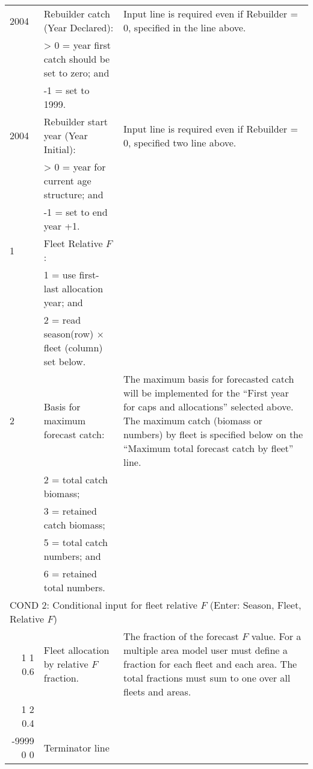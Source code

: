 \begin{landscape}
{\begin{longtable}{p{2cm} p{7cm} p{12cm}}
  \hline
  2004 & Rebuilder catch (Year Declared): & \multirow{1}{1cm}[-0.2cm]{\parbox{12cm}{Input line is required even if Rebuilder = 0, specified in the line above.}} \Tstrut\\
    & > 0 = year first catch should be set to zero; and & \\
    & -1 = set to 1999. & \Bstrut\\

  \hline
  2004 & Rebuilder start year (Year Initial): & \multirow{1}{1cm}[-0.2cm]{\parbox{12cm}{Input line is required even if Rebuilder = 0, specified two line above.}} \Tstrut\\
    & > 0 = year for current age structure; and & \\
    & -1 = set to end year +1. & \Bstrut\\

  \hline
  1 & Fleet Relative $F$: & \Tstrut\\
    & 1 = use first-last allocation year; and & \\
    & 2 = read season(row) $\times$ fleet (column) set below. & \Bstrut\\

  \hline 
  2 & Basis for maximum forecast catch: & \multirow{1}{1cm}[-0.25cm]{\parbox{12cm}{The maximum basis for forecasted catch will be implemented for the ``First year for caps and allocations'' selected above. The maximum catch (biomass or numbers) by fleet is specified below on the ``Maximum total forecast catch by fleet'' line.}} \Tstrut\\
    & 2 = total catch biomass; & \\
    & 3 = retained catch biomass; & \\
    & 5 = total catch numbers; and & \\
    & 6 = retained total numbers. & \Bstrut\\

  \hline 
  \multicolumn{3}{l}{COND 2: Conditional input for fleet relative $F$ (Enter: Season, Fleet, Relative $F$)} \Tstrut\\
  \multicolumn{1}{r}{1 1 0.6} & Fleet allocation by relative $F$ fraction. & \multirow{1}{1cm}[-0.25cm]{\parbox{12cm}{The fraction of the forecast $F$ value. For a multiple area model user must define a fraction for each fleet and each area. The total fractions must sum to one over all fleets and areas.}} \\
  \multicolumn{1}{r}{1 2 0.4} & & \\
  \multicolumn{1}{r}{-9999 0 0} & Terminator line & \Bstrut\\ 


\end{longtable}}
\end{landscape}
